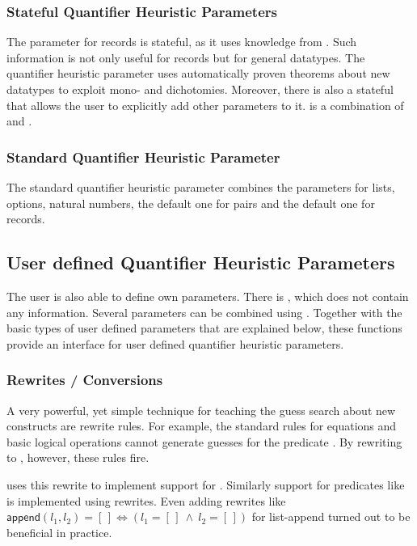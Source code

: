 \subsubsection{Stateful Quantifier Heuristic Parameters}

The parameter for records is stateful, as it uses knowledge from
. Such information is not only useful for records
but for general datatypes. The quantifier heuristic parameter
 uses automatically proven theorems about new
datatypes to exploit mono- and dichotomies. Moreover, there is also a
stateful  that allows the user to
explicitly add other parameters to it.   is a
combination of  and .

\subsubsection{Standard Quantifier Heuristic Parameter}

The standard quantifier heuristic parameter  combines
the parameters for lists, options, natural numbers, the default one
for pairs and the default one for records.


\subsection{User defined Quantifier Heuristic Parameters}\label{sec_qps_user}

The user is also able to define own parameters. There
is , which does not contain any information. Several
parameters can be combined using 
. Together with the basic types of user defined
parameters that are explained below, these functions provide an
interface for user defined quantifier heuristic parameters.

\subsubsection{Rewrites / Conversions}

A very powerful, yet simple technique for teaching the guess search
about new constructs are rewrite rules. For example, the standard rules
for equations and basic logical operations
cannot generate guesses for the predicate . By
rewriting  to , however, these rules fire.

 uses this rewrite to implement support for 
. Similarly support for predicates like  is
implemented using rewrites. Even adding
rewrites like $\textsf{append}(l_1, l_2) = [\,] \Longleftrightarrow (l_1 =
[\,]\ \wedge\ l_2 = [\,])$ for list-append turned out to be beneficial
in practice.
\bigskip

